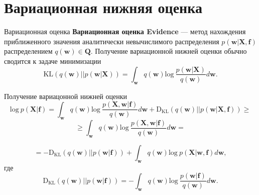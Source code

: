 \documentclass[10pt,pdf,utf8,russian,aspectratio=169]{beamer}
\begin{document}
\section{Вариационная нижняя оценка}
\begin{frame}{Вариационная оценка}
\textbf{Вариационная оценка Evidence} --- метод нахождения приближенного значения аналитически невычислимого распределения $p(\mathbf{w}|\mathbf{X}, \mathbf{f})$ распределением $q(\mathbf{w}) \in \mathbf{Q}$. Получение вариационной нижней оценки обычно сводится к задаче минимизации
$$\text{KL}(q(\mathbf{w})||p(\mathbf{w}| \mathbf{X}))=
\int_{\mathbf{w}} q(\mathbf{w}) \text{log}~\frac{p(\mathbf{w}| \mathbf{X})} {q(\mathbf{w})}d\mathbf{w}.
$$

\begin{figure}
  \centering
\label{fig:1}\qquad

\end{figure}

\end{frame}

\begin{frame}{Получение вариацонной нижней оценки}
$$
\text{log}~p(\mathbf{X}| \mathbf{f})  = \int_{\mathbf{w}} q(\mathbf{w})\text{log}~\frac{p(\mathbf{X},\mathbf{w}|\mathbf{f})}{q(\mathbf{w})}d\mathbf{w} + \text{D}_\text{KL}  (q(\mathbf{w})||p(\mathbf{w}| \mathbf{X}, \mathbf{f})) \geq	
$$
$$
\geq \int_{\mathbf{w}} q(\mathbf{w})\text{log}~\frac{p(\mathbf{X},\mathbf{w}|\mathbf{f})}{q(\mathbf{w})}d\mathbf{w} =
$$

$$
= -\text{D}_\text{KL} (q(\mathbf{w})||p(\mathbf{w}|\mathbf{f})) + \int_{\mathbf{w}} q(\mathbf{w})\text{log}~{p(\mathbf{X}|\mathbf{w},\mathbf{f})} d \mathbf{w},
$$
где $$\text{D}_\text{KL}(q(\mathbf{w})||p(\mathbf{w} |\mathbf{f})) = -\int_{\mathbf{w}} q(\mathbf{w})\text{log}~\frac{p(\mathbf{w} | \mathbf{f})}{q(\mathbf{w})}d\mathbf{w}.$$

\end{frame}
\end{document}
